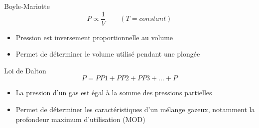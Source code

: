 \begin{frame}{Boyle-Mariotte}
	\[ \boxed{P \propto \frac{1}{V} \qquad (T=constant)} \]
	\begin{itemize}
		\item Pression est inversement proportionnelle au volume
		\item Permet de déterminer le volume utilisé pendant une plongée
	\end{itemize}
\end{frame}	

\begin{frame}{Loi de Dalton}
	\[\boxed{P = PP1 + PP2 + PP3 +...+P}\]
	\begin{itemize}
		\item La pression d'un gas est égal à la somme des pressions partielles
		\item Permet de déterminer les caractéristiques d'un mélange gazeux, notamment la profondeur maximum d'utilisation (MOD)
	\end{itemize}
\end{frame}

